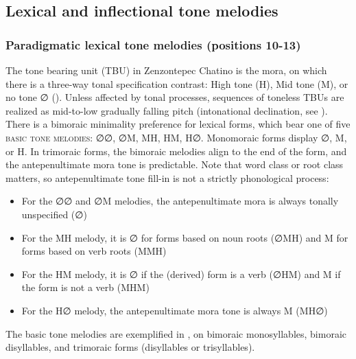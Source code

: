 \documentclass[output=paper]{langscibook}
\begin{document}
\subsection{Lexical and inflectional tone melodies}
\label{bkm:Ref90474687}\subsubsection{Paradigmatic lexical tone melodies (positions 10{}-13)} 
\label{bkm:Ref113307854}\label{bkm:Ref112962511}
The tone bearing unit (TBU) in Zenzontepec Chatino is the mora, on which there is a three-way tonal specification contrast: High tone (H), Mid tone (M), or no tone ∅ (\citealt{Campbell2014,Campbell2016}). Unless affected by tonal processes, sequences of toneless TBUs are realized as mid-to-low gradually falling pitch (intonational declination, see ). There is a bimoraic minimality preference for lexical forms, which bear one of five \textsc{basic} \textsc{tone} \textsc{melodies}: ∅∅, ∅M, MH, HM, H∅. Monomoraic forms display ∅, M, or H. In trimoraic forms, the bimoraic melodies align to the end of the form, and the antepenultimate mora tone is predictable. Note that word class or root class matters, so antepenultimate tone fill-in is not a strictly phonological process:

\begin{itemize}
\item For the ∅∅ and ∅M melodies, the antepenultimate mora is always tonally unspecified (∅) 
\item For the MH melody, it is ∅ for forms based on noun roots (∅MH) and M for forms based on verb roots (MMH)
\item For the HM melody, it is ∅ if the (derived) form is a verb (∅HM) and M if the form is not a verb (MHM)
\item For the H∅ melody, the antepenultimate mora tone is always M (MH∅)
\end{itemize}

The basic tone melodies are exemplified in , on bimoraic monosyllables, bimoraic disyllables, and trimoraic forms (disyllables or trisyllables). 
\end{document}
